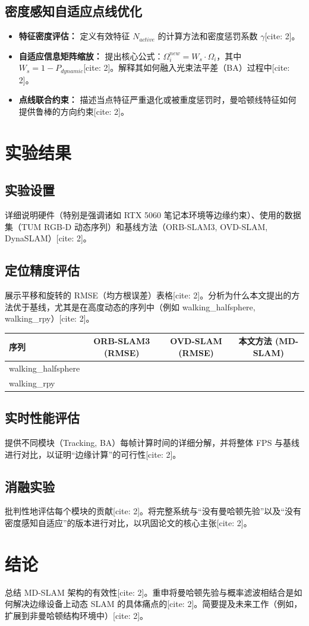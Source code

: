 \documentclass[12pt,a4paper]{ctexart}
\begin{document}
\subsection{密度感知自适应点线优化}
\begin{itemize}
    \item \textbf{特征密度评估：} 定义有效特征 $N_{active}$ 的计算方法和密度惩罚系数 $\gamma$[cite: 2]。
    \item \textbf{自适应信息矩阵缩放：} 提出核心公式：$\Omega_{i}^{new} = W_{s} \cdot \Omega_{i}$，其中 $W_{s} = 1 - P_{dynamic}$[cite: 2]。解释其如何融入光束法平差（BA）过程中[cite: 2]。
    \item \textbf{点线联合约束：} 描述当点特征严重退化或被重度惩罚时，曼哈顿线特征如何提供鲁棒的方向约束[cite: 2]。
\end{itemize}

\section{实验结果}
\subsection{实验设置}
详细说明硬件（特别是强调诸如 RTX 5060 笔记本环境等边缘约束）、使用的数据集（TUM RGB-D 动态序列）和基线方法（ORB-SLAM3, OVD-SLAM, DynaSLAM）[cite: 2]。

\subsection{定位精度评估}
展示平移和旋转的 RMSE（均方根误差）表格[cite: 2]。分析为什么本文提出的方法优于基线，尤其是在高度动态的序列中（例如 walking\_halfsphere, walking\_rpy）[cite: 2]。

\begin{table}[h]
\centering
\begin{tabular}{lccc}
\toprule
序列 & ORB-SLAM3 (RMSE) & OVD-SLAM (RMSE) & 本文方法 (MD-SLAM) \\
\midrule
walking\_halfsphere & & & \\
walking\_rpy & & & \\
\bottomrule
\end{tabular}
\end{table}

\subsection{实时性能评估}
提供不同模块（Tracking, BA）每帧计算时间的详细分解，并将整体 FPS 与基线进行对比，以证明“边缘计算”的可行性[cite: 2]。

\subsection{消融实验}
批判性地评估每个模块的贡献[cite: 2]。将完整系统与“没有曼哈顿先验”以及“没有密度感知自适应”的版本进行对比，以巩固论文的核心主张[cite: 2]。

\section{结论}
总结 MD-SLAM 架构的有效性[cite: 2]。重申将曼哈顿先验与概率滤波相结合是如何解决边缘设备上动态 SLAM 的具体痛点的[cite: 2]。简要提及未来工作（例如，扩展到非曼哈顿结构环境中）[cite: 2]。
\end{document}
